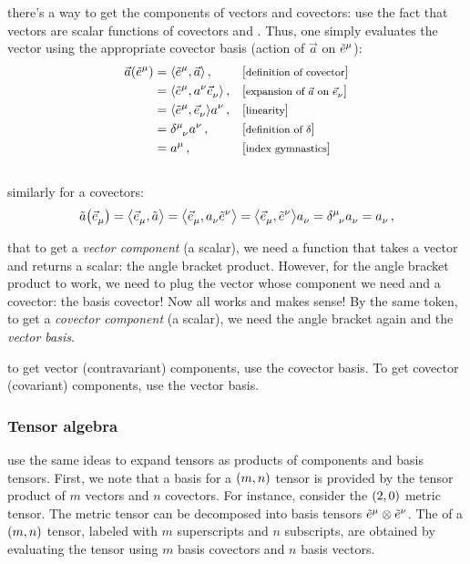  there's a  way to get the components of vectors and covectors: use the fact that vectors are scalar functions of covectors and \vicvers. Thus, one simply evaluates the vector using the appropriate covector basis (action of $\vec a$ on $\tbcov\mu$):
%
\begin{align}\label{eq:veccomponentsusingcovecbasis}
  \vec a\vat{\tbcov\mu} &= \sprod{\tbcov\mu}{\vec a}               \,,&&\eqtxt{definition of covector}\\\nonumber
                        &= \sprod{\tbcov\mu}{\tvec a\nu\tbvec\nu}  \,,&&\eqtxt{expansion of $\vec a$ on $\tbvec\nu$}\\\nonumber
                        &= \sprod{\tbcov\mu}{\tbvec\nu}\tvec a\nu  \,,&&\eqtxt{linearity}\\\nonumber
                        &= \tkron\mu\nu\tvec a\nu                  \,,&&\eqtxt{definition of $\kron$}\\\nonumber
                        &= \tvec a\mu                              \,,&&\eqtxt{index gymnastics}\\\nonumber
\end{align}
%
similarly for a covectors:
%
\begin{equation}\label{eq:covcomponentsusingvecbasis}
  \cov a\vat{\tbvec\mu} = \sprod{\tbvec\mu}{\cov a}
                        = \sprod{\tbvec\mu}{\tcov a\nu\tbcov\nu}
                        = \sprod{\tbvec\mu}{\tbcov\nu}\tcov a\nu
                        = \tkron\mu\nu\tcov a\nu
                        = \tcov a\nu\,,
\end{equation}

 that to get a \emph{vector component} (a scalar), we need a function that takes a vector and returns a scalar: the angle bracket product. However, for the angle bracket product to work, we need to plug the vector whose component we need and a covector: the basis covector! Now all works and makes sense! By the same token, to get a \emph{covector component} (a scalar), we need the angle bracket again and the \emph{vector basis}.

 to get vector (contravariant) components, use the covector basis. To get covector (covariant) components, use the vector basis.


\subsubsection{Tensor algebra}
%
 use the same ideas to expand tensors as products of components and basis tensors. First, we note that a basis for a $\torder mn$ tensor is provided by the tensor product of $m$ vectors and $n$ covectors. For instance, consider the $\torder 20$ metric tensor. The metric tensor can be decomposed into basis tensors $\tbcov\mu\tprod\tbcov\nu$. The  of a $\torder mn$ tensor, labeled with $m$ superscripts and $n$ subscripts, are obtained by evaluating the tensor using $m$ basis covectors and $n$ basis vectors.

